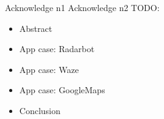 \begin{acknowledgments}
	 Acknowledge n1
	\newline
	Acknowledge n2
	\newline
	\newline
	TODO: 
	\begin{itemize}
		\item Abstract
		\item App case: Radarbot
		\item App case: Waze
		\item App case: GoogleMaps
		\item Conclusion
	\end{itemize}
\end{acknowledgments}